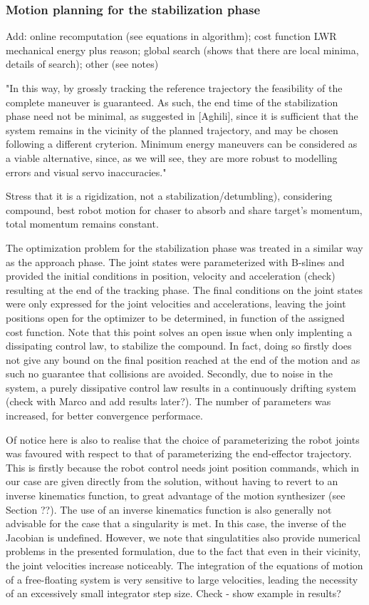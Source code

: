\subsubsection{Motion planning for the stabilization phase}

Add: online recomputation (see equations in algorithm); cost function LWR mechanical energy plus reason; global search (shows that there are local minima, details of search); other (see notes)

"In this way, by grossly tracking the reference trajectory the feasibility of the complete maneuver is guaranteed. As such, the end time of the stabilization phase need not be minimal, as suggested in [Aghili], since it is sufficient that the system remains in the vicinity of the planned trajectory, and may be chosen following a different cryterion. Minimum energy maneuvers can be considered as a viable alternative, since, as we will see, they are more robust to modelling errors and visual servo inaccuracies."

Stress that it is a rigidization, not a stabilization/detumbling), considering compound, best robot motion for chaser to absorb and share target's momentum, total momentum remains constant.

The optimization problem for the stabilization phase was treated in a similar way as the approach phase. The joint states were parameterized with B-slines and provided the initial conditions in position, velocity and acceleration (check) resulting at the end of the tracking phase. The final conditions on the joint states were only expressed for the joint velocities and accelerations, leaving the joint positions open for the optimizer to be determined, in function of the assigned cost function. Note that this point solves an open issue when only implenting a dissipating control law, to stabilize the compound. In fact, doing so firstly does not give any bound on the final position reached at the end of the motion and as such no guarantee that collisions are avoided. Secondly, due to noise in the system, a purely dissipative control law results in a continuously drifting system (check with Marco and add results later?). The number of parameters was increased, for better convergence performace. 

Of notice here is also to realise that the choice of parameterizing the robot joints was favoured with respect to that of parameterizing the end-effector trajectory. This is firstly because the robot control needs joint position commands, which in our case are given directly from the solution, without having to revert to an inverse kinematics function, to great advantage of the motion synthesizer (see Section ??). The use of an inverse kinematics function is also generally not advisable for the case that a singularity is met. In this case, the inverse of the Jacobian is undefined. However, we note that singulatities also provide numerical problems in the presented formulation, due to the fact that even in their vicinity, the joint velocities increase noticeably. The integration of the equations of motion of a free-floating system is very sensitive to large velocities, leading the necessity of an excessively small integrator step size. Check - show example in results?

